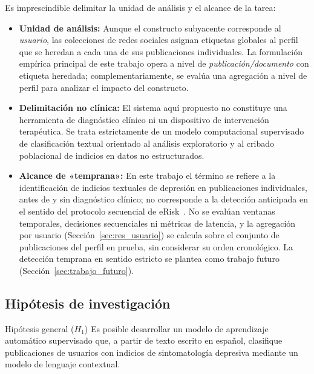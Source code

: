 \documentclass[12pt,a4paper]{article}
\begin{document}
Es imprescindible delimitar la unidad de análisis y el alcance de la tarea:
\begin{itemize}[leftmargin=2em]
    \item \textbf{Unidad de análisis:} Aunque el constructo subyacente corresponde al \emph{usuario}, las colecciones de redes sociales asignan etiquetas globales al perfil que se heredan a cada una de sus publicaciones individuales. La formulación empírica principal de este trabajo opera a nivel de \emph{publicación/documento} con etiqueta heredada; complementariamente, se evalúa una agregación a nivel de perfil para analizar el impacto del constructo.
    \item \textbf{Delimitación no clínica:} El sistema aquí propuesto no constituye una herramienta de diagnóstico clínico ni un dispositivo de intervención terapéutica. Se trata estrictamente de un modelo computacional supervisado de clasificación textual orientado al análisis exploratorio y al cribado poblacional de indicios en datos no estructurados.
    \item \textbf{Alcance de «temprana»:} En este trabajo el término se refiere a la identificación de indicios textuales de depresión en publicaciones individuales, antes de y sin diagnóstico clínico; no corresponde a la detección anticipada en el sentido del protocolo secuencial de eRisk~\cite{losada2017erisk}. No se evalúan ventanas temporales, decisiones secuenciales ni métricas de latencia, y la agregación por usuario (Sección~\ref{sec:res_usuario}) se calcula sobre el conjunto de publicaciones del perfil en prueba, sin considerar su orden cronológico. La detección temprana en sentido estricto se plantea como trabajo futuro (Sección~\ref{sec:trabajo_futuro}).
\end{itemize}

\newpage

\subsection{Hipótesis de investigación}
\label{sec:hipotesis}

\begin{destacado}{Hipótesis general ($H_1$)}
Es posible desarrollar un modelo de aprendizaje automático supervisado que, a partir de texto escrito en español, clasifique publicaciones de usuarios con indicios de sintomatología depresiva mediante un modelo de lenguaje contextual.
\end{destacado}
\end{document}
